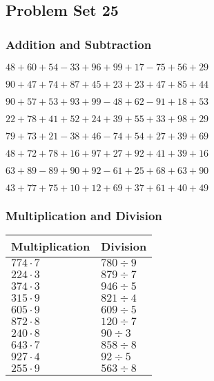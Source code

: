 \hypertarget{problem-set-25}{%
\subsection{Problem Set 25}\label{problem-set-25}}

\hypertarget{addition-and-subtraction}{%
\subsubsection{Addition and
Subtraction}\label{addition-and-subtraction}}

\(48+60+54-33+96+99+17-75+56+29\)

\(90+47+74+87+45+23+23+47+85+44\)

\(90+57+53+93+99-48+62-91+18+53\)

\(22+78+41+52+24+39+55+33+98+29\)

\(79+73+21-38+46-74+54+27+39+69\)

\(48+72+78+16+97+27+92+41+39+16\)

\(63+89-89+90+92-61+25+68+63+90\)

\(43+77+75+10+12+69+37+61+40+49\)

\hypertarget{multiplication-and-division}{%
\subsubsection{Multiplication and
Division}\label{multiplication-and-division}}

\begin{longtable}[]{@{}ll@{}}
\toprule
Multiplication & Division\tabularnewline
\midrule
\endhead
\(774\cdot7\) & \(780÷9\)\tabularnewline
\(224\cdot3\) & \(879÷7\)\tabularnewline
\(374\cdot3\) & \(946÷5\)\tabularnewline
\(315\cdot9\) & \(821÷4\)\tabularnewline
\(605\cdot9\) & \(609÷5\)\tabularnewline
\(872\cdot8\) & \(120÷7\)\tabularnewline
\(240\cdot8\) & \(90÷3\)\tabularnewline
\(643\cdot7\) & \(858÷8\)\tabularnewline
\(927\cdot4\) & \(92÷5\)\tabularnewline
\(255\cdot9\) & \(563÷8\)\tabularnewline
\bottomrule
\end{longtable}
